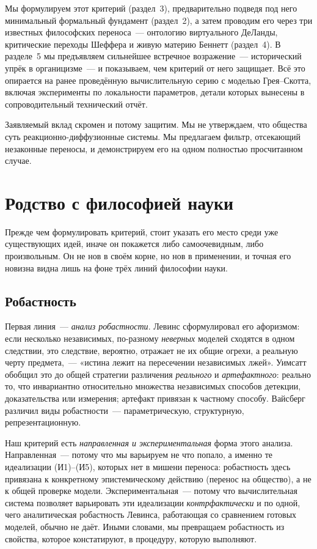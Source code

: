 \documentclass[11pt]{article}
\begin{document}
Мы формулируем этот критерий (раздел~3), предварительно подведя под него минимальный формальный фундамент
(раздел~2), а затем проводим его через три известных философских переноса~— онтологию виртуального ДеЛанды,
критические переходы Шеффера и живую материю Беннетт (раздел~4). В разделе~5 мы предъявляем сильнейшее
встречное возражение~— исторический упрёк в органицизме~— и показываем, чем критерий от него защищает. Всё это
опирается на ранее проведённую вычислительную серию с моделью Грея–Скотта, включая эксперименты по локальности
параметров, детали которых вынесены в сопроводительный технический отчёт.

Заявляемый вклад скромен и потому защитим. Мы не утверждаем, что общества суть реакционно-диффузионные системы.
Мы предлагаем фильтр, отсекающий незаконные переносы, и демонстрируем его на одном полностью просчитанном случае.

\section{Родство с философией науки}
Прежде чем формулировать критерий, стоит указать его место среди уже существующих идей, иначе он покажется либо
самоочевидным, либо произвольным. Он не нов в своём корне, но нов в применении, и точная его новизна видна лишь на
фоне трёх линий философии науки.

\subsection{Робастность}
Первая линия~— \emph{анализ робастности}. Левинс \cite{levins1966} сформулировал его афоризмом: если несколько
независимых, по-разному \emph{неверных} моделей сходятся в одном следствии, это следствие, вероятно, отражает не
их общие огрехи, а реальную черту предмета,~— «истина лежит на пересечении независимых лжей». Уимсатт
\cite{wimsatt2007} обобщил это до общей стратегии различения \emph{реального} и \emph{артефактного}: реально то,
что инвариантно относительно множества независимых способов детекции, доказательства или измерения; артефакт
привязан к частному способу. Вайсберг \cite{weisberg2006} различил виды робастности~— параметрическую,
структурную, репрезентационную.

Наш критерий есть \emph{направленная и экспериментальная} форма этого анализа. Направленная~— потому что мы
варьируем не что попало, а именно те идеализации (И1)–(И5), которых нет в мишени переноса: робастность здесь
привязана к конкретному эпистемическому действию (перенос на общество), а не к общей проверке модели.
Экспериментальная~— потому что вычислительная система позволяет варьировать эти идеализации \emph{контрфактически}
и по одной, чего аналитическая робастность Левинса, работающая со сравнением готовых моделей, обычно не даёт. Иными
словами, мы превращаем робастность из свойства, которое констатируют, в процедуру, которую выполняют.
\end{document}
